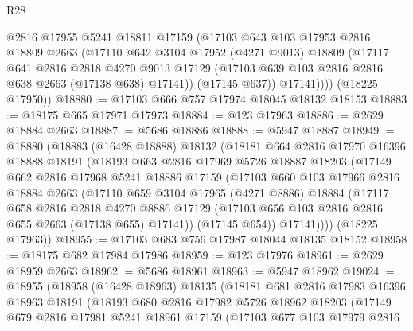 \begin{lexlean}{R28}
\begin{coremodule}
            @2816
            @17955
            @5241
            @18811
            @17159
            (@17103
              @643
              @103
              @17953
              @2816
              @18809
              @2663
              (@17110
                @642
                @3104
                @17952
                (@4271 @9013)
                @18809
                (@17117
                  @641
                  @2816
                  @2818
                  @4270
                  @9013
                  @17129
                  (@17103 @639 @103 @2816 @2816 @638 @2663 (@17138 @638) @17141))
                (@17145 @637))
              @17141))))
      (@18225 @17950))
@18880 := @17103 @666 @757 @17974 @18045 @18132 @18153
@18883 := @18175 @665 @17971 @17973
@18884 := @123 @17963
@18886 := @2629 @18884 @2663
@18887 := @5686 @18886
@18888 := @5947 @18887
@18949 := @18880
    (@18883
      (@16428 @18888)
      @18132
      (@18181
        @664
        @2816
        @17970
        @16396
        @18888
        @18191
        (@18193
          @663
          @2816
          @17969
          @5726
          @18887
          @18203
          (@17149
            @662
            @2816
            @17968
            @5241
            @18886
            @17159
            (@17103
              @660
              @103
              @17966
              @2816
              @18884
              @2663
              (@17110
                @659
                @3104
                @17965
                (@4271 @8886)
                @18884
                (@17117
                  @658
                  @2816
                  @2818
                  @4270
                  @8886
                  @17129
                  (@17103 @656 @103 @2816 @2816 @655 @2663 (@17138 @655) @17141))
                (@17145 @654))
              @17141))))
      (@18225 @17963))
@18955 := @17103 @683 @756 @17987 @18044 @18135 @18152
@18958 := @18175 @682 @17984 @17986
@18959 := @123 @17976
@18961 := @2629 @18959 @2663
@18962 := @5686 @18961
@18963 := @5947 @18962
@19024 := @18955
    (@18958
      (@16428 @18963)
      @18135
      (@18181
        @681
        @2816
        @17983
        @16396
        @18963
        @18191
        (@18193
          @680
          @2816
          @17982
          @5726
          @18962
          @18203
          (@17149
            @679
            @2816
            @17981
            @5241
            @18961
            @17159
            (@17103
              @677
              @103
              @17979
              @2816

\end{coremodule}
\end{lexlean}
